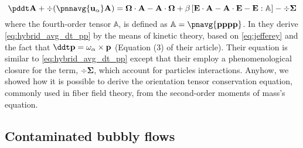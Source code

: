 \begin{equation}
    \pddt \textbf{A}
    + \div (
        \pnnavg{\textbf{u}_\alpha}\textbf{A}
    )
    =
    \mathbf{\Omega} \cdot \textbf{A}
    - \textbf{A} \cdot \mathbf{\Omega}
    + \beta\left[
        \textbf{E} \cdot \textbf{A}
        -\textbf{A} \cdot \textbf{E}
        - \textbf{E} : \mathbb{A}
    \right]
    - \div \mathbf{\Sigma}
    \label{eq:hybrid_avg_dt_pp}
\end{equation}
where the fourth-order tensor $\mathbb{A}$, is defined as $\mathbb{A} = \pnavg{\textbf{pppp}}$.
In \citet{wang2008objective} they derive \ref{eq:hybrid_avg_dt_pp} by the means of kinetic theory, based on \ref{eq:jefferey} and the fact that $\ddt \textbf{p} = \omega_\alpha \times \textbf{p}$ (Equation (3) of their article).
Their equation is similar to \ref{eq:hybrid_avg_dt_pp} except that their employ a phenomenological closure for the term, $\div \mathbf{\Sigma}$, which account for particles interactions.
Anyhow, we showed how it is possible to derive the orientation tensor conservation equation, commonly used in fiber field theory, from the second-order moments of mass's equation. 

\subsection{Contaminated bubbly flows}

